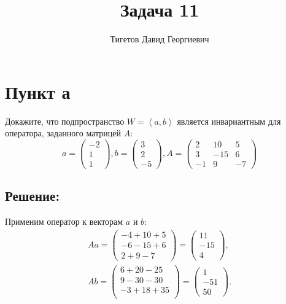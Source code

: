 \documentclass[12pt]{article}
\begin{document}
    \title{Задача 11}
    \author{Тигетов Давид Георгиевич}
    \date{}
    \maketitle

    \section*{Пункт а}
    Докажите, что подпространство $W = \left < a, b \right >$ является инвариантным для оператора, заданного матрицей $A$:
    \[
        a = \begin{pmatrix}
                -2 \\ 1 \\ 1
        \end{pmatrix},
        b = \begin{pmatrix}
                3 \\ 2 \\ -5
        \end{pmatrix},
        A = \begin{pmatrix}
                2 & 10 & 5 \\
                3 & -15 & 6 \\
                -1 & 9 & -7
        \end{pmatrix}
    \]

    \subsection*{Решение:}
    Применим оператор к векторам $a$ и $b$:
    \begin{gather*}
        A a
        =
        \begin{pmatrix}
            -4 + 10 + 5 \\
            -6 - 15 + 6 \\
            2 + 9 - 7
        \end{pmatrix}
        =
        \begin{pmatrix}
            11 \\
            -15 \\
            4
        \end{pmatrix} , \\
        A b
        =
        \begin{pmatrix}
            6 + 20 - 25 \\
            9 - 30 - 30 \\
            - 3 + 18 + 35 \\
        \end{pmatrix}
        =
        \begin{pmatrix}
            1 \\
            - 51 \\
            50
        \end{pmatrix}
        .
    \end{gather*}
\end{document}
